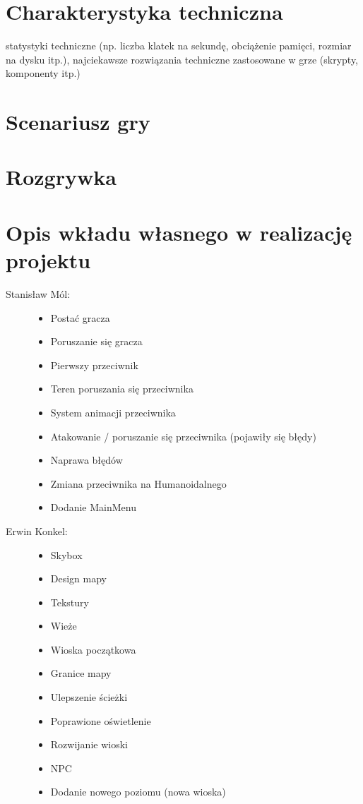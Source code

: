 \documentclass[10pt,a4paper]{article}
\begin{document}
\clearpage
\section{Charakterystyka techniczna}
statystyki techniczne (np. liczba klatek na sekundę, obciążenie pamięci, rozmiar na dysku itp.), najciekawsze rozwiązania techniczne zastosowane w grze (skrypty, komponenty itp.)\\

\clearpage
\section{Scenariusz gry}

\clearpage
\section{Rozgrywka}

\clearpage
\section{Opis wkładu własnego w realizację projektu}

\vspace{0.5cm}
\begin{description}
  \item[Stanisław Mól:] \hfill
  	\begin{itemize}
 	  \item Postać gracza
 	  \item Poruszanie się gracza
	  \item Pierwszy przeciwnik
	  \item Teren poruszania się przeciwnika
	  \item System animacji przeciwnika
	  \item Atakowanie / poruszanie się przeciwnika (pojawiły się błędy)
	  \item Naprawa błędów
	  \item Zmiana przeciwnika na Humanoidalnego
	  \item Dodanie MainMenu
	\end{itemize}
  \item[ Erwin Konkel:] \hfill
  	\begin{itemize}
          \item Skybox
  	  \item Design mapy
 	  \item Tekstury
  	  \item Wieże
	  \item Wioska początkowa
 	  \item Granice mapy
  	  \item Ulepszenie ścieżki 
  	  \item Poprawione oświetlenie
	  \item Rozwijanie wioski
	  \item NPC
	  \item Dodanie nowego poziomu (nowa wioska)
	\end{itemize}
\end{description}
\end{document}
